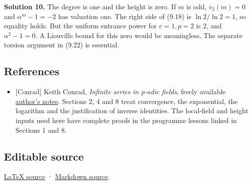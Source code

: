 \documentclass[
  11pt,
  a4paper,
]{article}
\providecommand{\tightlist}{%
  \setlength{\itemsep}{0pt}\setlength{\parskip}{0pt}}
\begin{document}
\textbf{Solution 10.} The degree is one and the height is zero. If \(m\)
is odd, \(v_2(m)=0\) and \(\alpha^m-1=-2\) has valuation one. The right
side of (9.18) is \(\ln2/\ln2=1\), so equality holds. But the uniform
entrance power for \(e=1,p=2\) is \(2\), and \(\alpha^2-1=0\). A
Liouville bound for this zero would be meaningless. The separate torsion
argument in (9.22) is essential.

\subsection{References}\label{references}

\begin{itemize}
\tightlist
\item
  {[}Conrad{]} Keith Conrad, \emph{Infinite series in p-adic fields},
  freely available
  \href{https://kconrad.math.uconn.edu/blurbs/gradnumthy/infseriespadic.pdf}{author's
  notes}. Sections 2, 4 and 8 treat convergence, the exponential, the
  logarithm and the justification of inverse identities. The local-field
  and height inputs used here have complete proofs in the programme
  lessons linked in Sections 1 and 8.
\end{itemize}

\subsection{Editable source}\label{editable-source}

\href{https://kokunoyumeto.github.io/open-math-courses-public/courses/TR-BAKER/sources/TR-BAKER-09.tex}{LaTeX source} ·
\href{https://kokunoyumeto.github.io/open-math-courses-public/courses/TR-BAKER/src/TR-BAKER-09.md}{Markdown source}.
\end{document}

